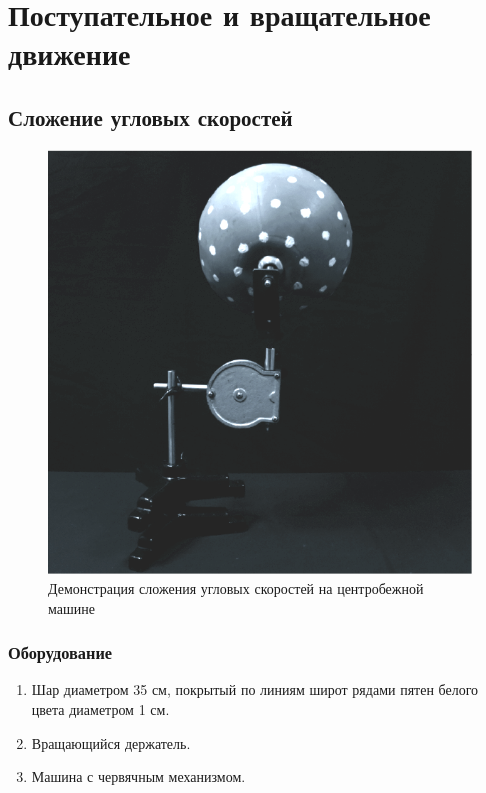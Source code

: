 \documentclass[../../All.tex]{subfiles}
\begin{document}



\chapter{\textcolor{PineGreen}{Поступательное и вращательное движение}}

\section{Сложение угловых скоростей}


\begin{figure}[H] 
	\centering 	
	\includegraphics[width=0.65\linewidth]{angular-1.png}
	\caption{Демонстрация сложения угловых скоростей на центробежной машине}
	\label{angular-1}
\end{figure}

\subsection*{\textcolor{PineGreen}{Оборудование}}

\begin{enumerate}
	\item Шар диаметром 35 см, покрытый по линиям широт рядами пятен белого цвета диаметром 1 см.
	\item Вращающийся держатель.
	\item Машина с червячным механизмом.
\end{enumerate}
\end{document}
